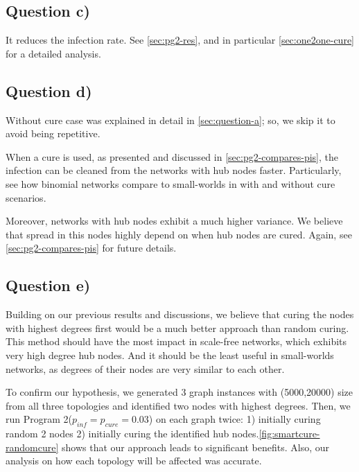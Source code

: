 \documentclass[conference]{IEEEtran}
\begin{document}
\subsection{Question c)}

It reduces the infection rate. See \autoref{sec:pg2-res}, and in particular \autoref{sec:one2one-cure} for a detailed analysis.

\subsection{Question d)}

Without cure case was explained in detail in \autoref{sec:question-a}; so, we skip it to avoid being repetitive.

When a cure is used, as presented and discussed in \autoref{sec:pg2-compares-pis}, the infection can be cleaned from the networks with hub nodes faster. Particularly, see how binomial networks compare to small-worlds in with and without cure scenarios.

Moreover, networks with hub nodes exhibit a much higher variance. We believe that spread in this nodes highly depend on when hub nodes are cured. Again, see \autoref{sec:pg2-compares-pis} for future details.

\subsection{Question e)}

Building on our previous results and discussions, we believe that curing the nodes with highest degrees first would be a much better approach than random curing. This method should have the most impact in scale-free networks, which exhibits very high degree hub nodes. And it should be the least useful in small-worlds networks, as degrees of their nodes are very similar to each other.

To confirm our hypothesis, we generated 3 graph instances with (5000,20000) size from all three topologies and identified two nodes with highest degrees. Then, we run Program 2($p_{inf} = p_{cure} = 0.03$) on each graph twice: 1) initially curing random 2 nodes 2) initially curing the identified hub nodes.\autoref{fig:smartcure-randomcure} shows that our approach leads to significant benefits. Also, our analysis on how each topology will be affected was accurate.
\end{document}
